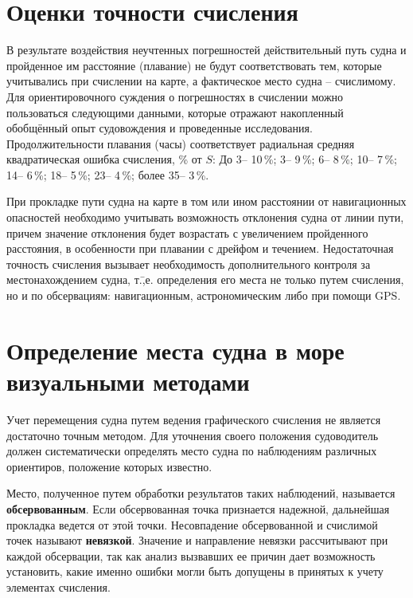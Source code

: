 \section{Оценки точности счисления}

В результате воздействия неучтенных погрешностей действительный путь судна и пройденное им расстояние (плавание) не будут соответствовать тем, которые учитывались при счислении на карте, а фактическое место судна \--- счислимому. Для ориентировочного суждения о погрешностях в счислении можно пользоваться следующими данными, которые отражают накопленный обобщённый опыт судовождения и проведенные исследования. Продолжительности плавания (часы) соответствует радиальная средняя квадратическая ошибка счисления, \% от $S$: До 3\thr \--- 10\,\%; 3\thr \--- 9\,\%; 6\thr \--- 8\,\%; 10\thr \--- 7\,\%; 14\thr \--- 6\,\%; 18\thr \--- 5\,\%; 23\thr \--- 4\,\%; более 35\thr \--- 3\,\%.

При прокладке пути судна на карте в том или ином расстоянии от навигационных опасностей необходимо учитывать возможность отклонения судна от линии пути, причем значение отклонения будет возрастать с увеличением пройденного расстояния, в особенности при плавании с дрейфом и течением. Недостаточная точность счисления вызывает необходимость дополнительного контроля за местонахождением судна, т.\=,е. определения его места не только путем счисления, но и по обсервациям: навигационным, астрономическим либо при помощи GPS.  

\section{Определение места судна в море визуальными методами}

Учет перемещения судна путем ведения графического счисления не является достаточно точным методом. Для уточнения своего положения судоводитель должен систематически определять место судна по наблюдениям различных ориентиров, положение которых известно. 

Место, полученное путем обработки результатов таких наблюдений, называется \textbf{обсервованным}. Если обсервованная точка признается надежной, дальнейшая прокладка ведется от этой точки. Несовпадение обсервованной и счислимой точек называют \textbf{невязкой}. Значение и направление невязки рассчитывают при каждой обсервации, так как анализ вызвавших ее причин дает возможность установить, какие именно ошибки могли быть допущены в принятых к учету элементах счисления. 


